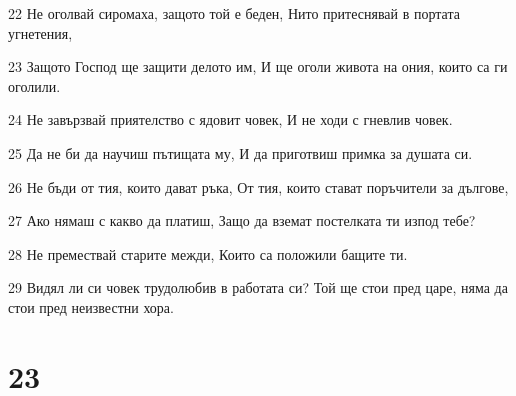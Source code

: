 \par 22 Не оголвай сиромаха, защото той е беден, Нито притеснявай в портата угнетения,
\par 23 Защото Господ ще защити делото им, И ще оголи живота на ония, които са ги оголили.
\par 24 Не завързвай приятелство с ядовит човек, И не ходи с гневлив човек.
\par 25 Да не би да научиш пътищата му, И да приготвиш примка за душата си.
\par 26 Не бъди от тия, които дават ръка, От тия, които стават поръчители за дългове,
\par 27 Ако нямаш с какво да платиш, Защо да вземат постелката ти изпод тебе?
\par 28 Не премествай старите межди, Които са положили бащите ти.
\par 29 Видял ли си човек трудолюбив в работата си? Той ще стои пред царе, няма да стои пред неизвестни хора.

\chapter{23}

